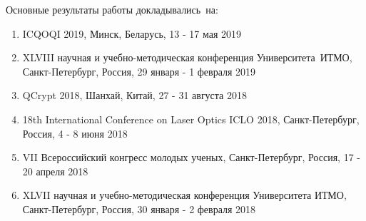 {\probation}
Основные результаты работы докладывались~на:
\begin{enumerate}
	\item ICQOQI 2019, Минск, Беларусь, 13 - 17 мая 2019
	\item XLVIII научная и учебно-методическая конференция Университета~ИТМО, Санкт-Петербург, Россия, 29 января - 1 февраля 2019
	\item QCrypt 2018, Шанхай, Китай, 27 - 31 августа 2018
	\item 18th International Conference on Laser Optics ICLO 2018, Санкт-Петербург, Россия, 4 - 8 июня 2018
	\item VII Всероссийский конгресс молодых ученых, Санкт-Петербург, Россия, 17 - 20 апреля 2018
	\item XLVII научная и учебно-методическая конференция Университета ИТМО, Санкт-Петербург, Россия, 30 января - 2 февраля 2018
\end{enumerate}



